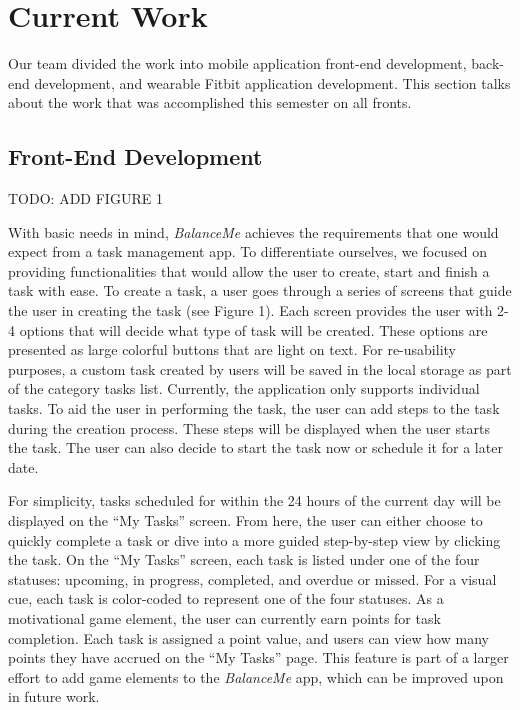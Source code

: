 \documentclass{sigchi}
\begin{document}
\section{Current Work}

Our team divided the work into mobile application front-end development,
back-end development, and wearable Fitbit application development. This section
talks about the work that was accomplished this semester on all fronts.


\subsection{Front-End Development}

\large{TODO: ADD FIGURE 1}


With basic needs in mind, \textit{BalanceMe} achieves the requirements that one
would expect from a task management app. To differentiate ourselves, we focused
on providing functionalities that would allow the user to create, start and
finish a task with ease. To create a task, a user goes through a series of
screens that guide the user in creating the task (see Figure 1). Each screen
provides the user with 2-4 options that will decide what type of task will be
created. These options are presented as large colorful buttons that are light
on text. For re-usability purposes, a custom task created by users will be
saved in the local storage as part of the category tasks list. Currently, the
application only supports individual tasks. To aid the user in performing the
task, the user can add steps to the task during the creation process. These
steps will be displayed when the user starts the task. The user can also decide
to start the task now or schedule it for a later date.

For simplicity, tasks scheduled for within the 24 hours of the current day will
be displayed on the ``My Tasks'' screen.  From here, the user can either choose
to quickly complete a task or dive into a more guided step-by-step view by
clicking the task. On the ``My Tasks'' screen, each task is listed under one of
the four statuses: upcoming, in progress, completed, and overdue or missed. For
a visual cue, each task is color-coded to represent one of the four statuses.
As a motivational game element, the user can currently earn points for task
completion. Each task is assigned a point value, and users can view how many
points they have accrued on the ``My Tasks'' page. This feature is part of a
larger effort to add game elements to the \textit{BalanceMe} app, which can be
improved upon in future work.
\end{document}
